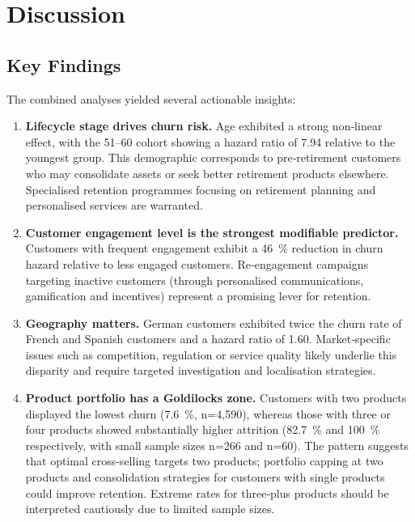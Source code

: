 \documentclass[12pt]{article}
\begin{document}
\section{Discussion}
\subsection{Key Findings}
The combined analyses yielded several actionable insights:

\begin{enumerate}
  \item \textbf{Lifecycle stage drives churn risk.}  Age exhibited a strong non‑linear effect, with the 51–60 cohort showing a hazard ratio of 7.94 relative to the youngest group.  This demographic corresponds to pre‑retirement customers who may consolidate assets or seek better retirement products elsewhere.  Specialised retention programmes focusing on retirement planning and personalised services are warranted.

  \item \textbf{Customer engagement level is the strongest modifiable predictor.}  Customers with frequent engagement exhibit a 46~\% reduction in churn hazard relative to less engaged customers.  Re‑engagement campaigns targeting inactive customers (through personalised communications, gamification and incentives) represent a promising lever for retention.

  \item \textbf{Geography matters.}  German customers exhibited twice the churn rate of French and Spanish customers and a hazard ratio of 1.60.  Market‑specific issues such as competition, regulation or service quality likely underlie this disparity and require targeted investigation and localisation strategies.

  \item \textbf{Product portfolio has a Goldilocks zone.}  Customers with two products displayed the lowest churn (7.6~\%, n=4,590), whereas those with three or four products showed substantially higher attrition (82.7~\% and 100~\% respectively, with small sample sizes n=266 and n=60).  The pattern suggests that optimal cross‑selling targets two products; portfolio capping at two products and consolidation strategies for customers with single products could improve retention.  Extreme rates for three‑plus products should be interpreted cautiously due to limited sample sizes.


\end{enumerate}
\end{document}
